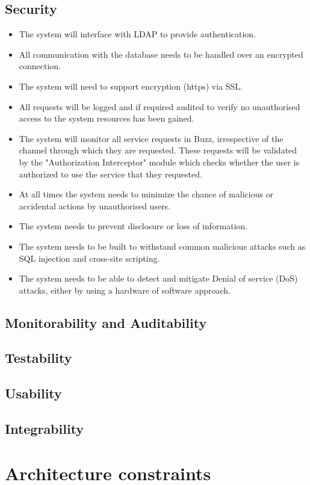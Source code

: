 \documentclass[a4paper,12pt,titlepage]{article}
\begin{document}
\subsection{Security}
\begin{itemize}
	\item The system will interface with LDAP to provide authentication.
	\item All communication with the database needs to be handled over an encrypted connection.
	\item The system will need to support encryption (https) via SSL.
	\item All requests will be logged and if required audited to verify no unauthorised access to the system resources has been gained.
	\item The system will monitor all service requests in Buzz, irrespective of the channel through which they are requested. These requests will be validated by the "Authorization Interceptor" module which checks whether the user is authorized to use the service that they requested. 
	\item At all times the system needs to minimize the chance of malicious or accidental actions by unauthorised users. 
	\item The system needs to prevent disclosure or loss of information. 
	\item The system needs to be built to withstand common malicious attacks such as SQL injection and cross-site scripting.
	\item The system needs to be able to detect and mitigate Denial of service (DoS) attacks, either by using a hardware of software approach. 
\end{itemize}
\subsection{Monitorability and Auditability}
\subsection{Testability}
\subsection{Usability}
\subsection{Integrability}


\pagebreak
\section{Architecture constraints}

\end{document}
